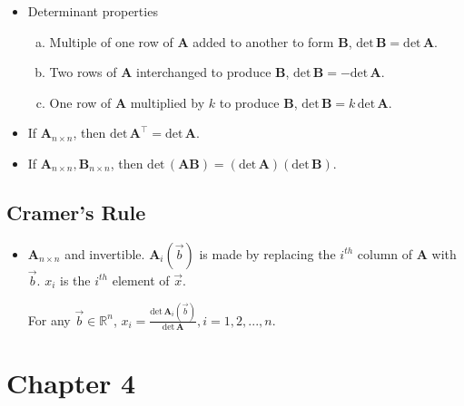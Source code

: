 \documentclass[11pt]{article}
\newcommand{\Thm}{\fbox{Thm}}
\newcommand{\R}{\mathbb{R}}
\newcommand{\A}{\mathbf{A}}
\begin{document}
\begin{itemize}
\item[\Thm] Determinant properties
\begin{enumerate} [a)]
  \item Multiple of one row of $\A$ added to another to form $\mathbf{B}$, 
  $\text{det} \, \mathbf{B} = \text{det}\, \A$.
  \item Two rows of $\A$ interchanged to produce $\mathbf{B}$, 
  $\text{det}\, \mathbf{B} = - \text{det} \, \A$.
  \item One row of $\A$ multiplied by $k$ to produce $\mathbf{B}$,
  $\text{det} \, \mathbf{B} = k \, \text{det}\, \A$.
\end{enumerate}

\item[\Thm] If $\A_{n \times n}$, then $\text{det} \, \A^\intercal = \text{det} 
\, \A$.

\item[\Thm] If $\A_{n \times n}, \mathbf{B}_{n \times n}$, then 
$\text{det} \, (\A \mathbf{B}) = (\text{det} \, \A)(\text{det} \, \mathbf{B})$. 

\end{itemize}

\subsection{Cramer's Rule}

\begin{itemize}

\item[\Thm] $\A_{n \times n}$ and invertible. $\A_i(\vec{b})$ is made by replacing 
the $i^{th}$ column of $\A$ with $\vec{b}$. $x_i$ is the $i^{th}$ element of $\vec{x}$.

For any $\vec{b} \in \R^n$, $x_i = \frac{\text{det} \, \A_i(\vec{b})}
{\text{det} \, \A}, i=1,2,...,n$.
\end{itemize}

\newpage

\section{Chapter 4}
\end{document}
